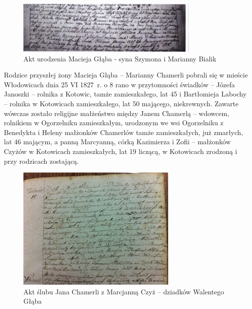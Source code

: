 \begin{figure}[!h]
\begin{center}
\includegraphics[width=0.8\textwidth]{zdjecia/akt_urodzenia_macieja_glaba.jpg}
\caption[Akt urodzenia Macieja Głąba]{Akt urodzenia Macieja Głąba - syna Szymona i Marianny Bialik}
\label{rys:akt_urodzenia_macieja_glaba}
\end{center}
\end{figure}

Rodzice przyszłej żony Macieja Głąba -- Marianny Chamerli pobrali się w mieście Włodowicach dnia 25 VI 1827~r. o 8 rano w przytomności świadków -- Józefa Janoszki -- rolnika z Kotowic, tamże zamieszkałego, lat 45 i Bartłomieja Labochy -- rolnika w Kotowicach zamieszkałego, lat 50 mającego, niekrewnych. Zawarte wówczas zostało religijne małżeństwo między Janem Chamerlą -- wdowcem, rolnikiem w Ogorzelniku zamieszkałym, urodzonym we wsi Ogorzelniku z Benedykta i Heleny małżonków Chamerlów tamże zamieszkałych, już zmarłych, lat 46 mającym, a panną Marcyanną, córką Kazimierza i Zofii -- małżonków Czyżów w Kotowicach zamieszkałych, lat 19 liczącą, w Kotowicach zrodzoną i przy rodzicach zostającą.

\begin{figure}[!h]
\begin{center}
\includegraphics[width=0.7\textwidth]{zdjecia/akt_slubu_jana_chamerli_i_marcjanny_czyz.jpg}
\caption[Akt ślubu Jana Chamerli z Marcjanną Czyż]{Akt ślubu Jana Chamerli z Marcjanną Czyż -- dziadków Walentego Głąba}
\label{rys:akt_slubu_jana_chamerli_i_marcjanny_czyz}
\end{center}
\end{figure}

